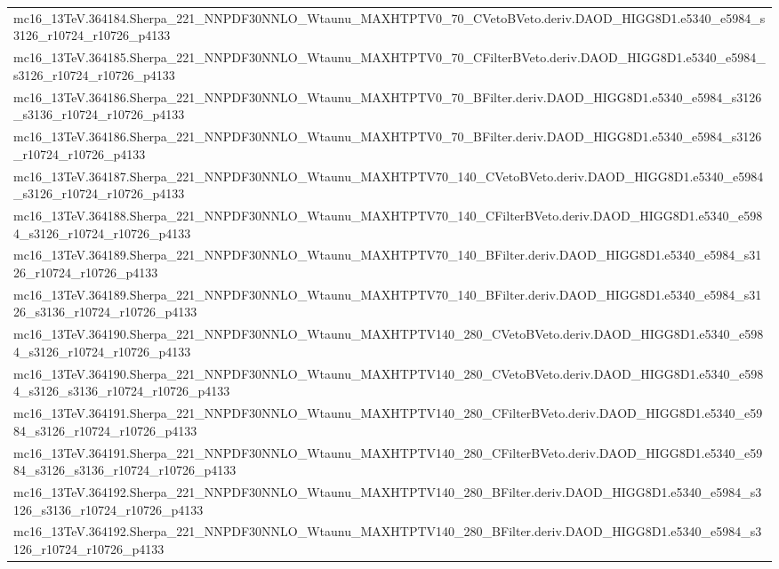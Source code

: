 \begin{adjustwidth}{-3em}{-3em}
\begin{longtable}{l}
mc16\_13TeV.364184.Sherpa\_221\_NNPDF30NNLO\_Wtaunu\_MAXHTPTV0\_70\_CVetoBVeto.deriv.DAOD\_HIGG8D1.e5340\_e5984\_s3126\_r10724\_r10726\_p4133 \\
mc16\_13TeV.364185.Sherpa\_221\_NNPDF30NNLO\_Wtaunu\_MAXHTPTV0\_70\_CFilterBVeto.deriv.DAOD\_HIGG8D1.e5340\_e5984\_s3126\_r10724\_r10726\_p4133 \\
mc16\_13TeV.364186.Sherpa\_221\_NNPDF30NNLO\_Wtaunu\_MAXHTPTV0\_70\_BFilter.deriv.DAOD\_HIGG8D1.e5340\_e5984\_s3126\_s3136\_r10724\_r10726\_p4133 \\
mc16\_13TeV.364186.Sherpa\_221\_NNPDF30NNLO\_Wtaunu\_MAXHTPTV0\_70\_BFilter.deriv.DAOD\_HIGG8D1.e5340\_e5984\_s3126\_r10724\_r10726\_p4133 \\
mc16\_13TeV.364187.Sherpa\_221\_NNPDF30NNLO\_Wtaunu\_MAXHTPTV70\_140\_CVetoBVeto.deriv.DAOD\_HIGG8D1.e5340\_e5984\_s3126\_r10724\_r10726\_p4133 \\
mc16\_13TeV.364188.Sherpa\_221\_NNPDF30NNLO\_Wtaunu\_MAXHTPTV70\_140\_CFilterBVeto.deriv.DAOD\_HIGG8D1.e5340\_e5984\_s3126\_r10724\_r10726\_p4133 \\
mc16\_13TeV.364189.Sherpa\_221\_NNPDF30NNLO\_Wtaunu\_MAXHTPTV70\_140\_BFilter.deriv.DAOD\_HIGG8D1.e5340\_e5984\_s3126\_r10724\_r10726\_p4133 \\
mc16\_13TeV.364189.Sherpa\_221\_NNPDF30NNLO\_Wtaunu\_MAXHTPTV70\_140\_BFilter.deriv.DAOD\_HIGG8D1.e5340\_e5984\_s3126\_s3136\_r10724\_r10726\_p4133 \\
mc16\_13TeV.364190.Sherpa\_221\_NNPDF30NNLO\_Wtaunu\_MAXHTPTV140\_280\_CVetoBVeto.deriv.DAOD\_HIGG8D1.e5340\_e5984\_s3126\_r10724\_r10726\_p4133 \\
mc16\_13TeV.364190.Sherpa\_221\_NNPDF30NNLO\_Wtaunu\_MAXHTPTV140\_280\_CVetoBVeto.deriv.DAOD\_HIGG8D1.e5340\_e5984\_s3126\_s3136\_r10724\_r10726\_p4133 \\
mc16\_13TeV.364191.Sherpa\_221\_NNPDF30NNLO\_Wtaunu\_MAXHTPTV140\_280\_CFilterBVeto.deriv.DAOD\_HIGG8D1.e5340\_e5984\_s3126\_r10724\_r10726\_p4133 \\
mc16\_13TeV.364191.Sherpa\_221\_NNPDF30NNLO\_Wtaunu\_MAXHTPTV140\_280\_CFilterBVeto.deriv.DAOD\_HIGG8D1.e5340\_e5984\_s3126\_s3136\_r10724\_r10726\_p4133 \\
mc16\_13TeV.364192.Sherpa\_221\_NNPDF30NNLO\_Wtaunu\_MAXHTPTV140\_280\_BFilter.deriv.DAOD\_HIGG8D1.e5340\_e5984\_s3126\_s3136\_r10724\_r10726\_p4133 \\
mc16\_13TeV.364192.Sherpa\_221\_NNPDF30NNLO\_Wtaunu\_MAXHTPTV140\_280\_BFilter.deriv.DAOD\_HIGG8D1.e5340\_e5984\_s3126\_r10724\_r10726\_p4133 \\

\end{longtable}
\end{adjustwidth}
